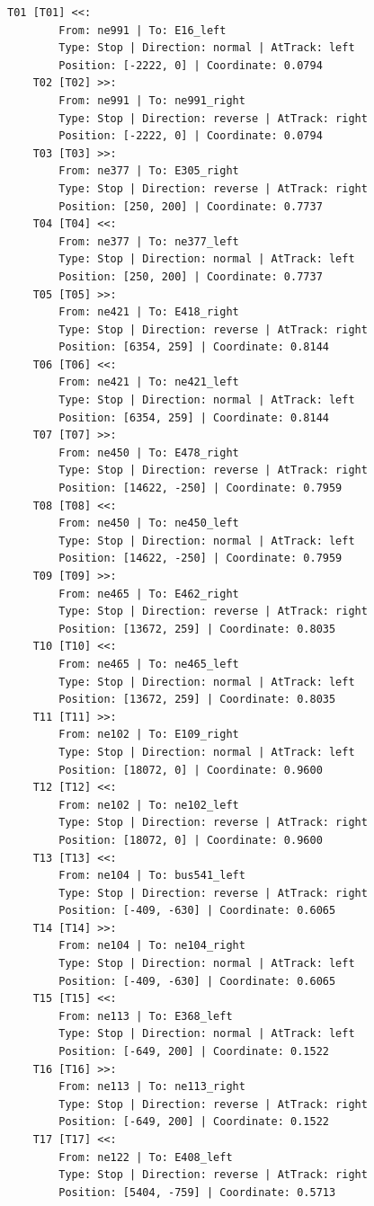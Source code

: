 \begin{lstlisting}[language = {}, tabsize=4, basicstyle=\footnotesize\ttfamily, showspaces=false, showstringspaces=false, caption = Signalling.RNA, label = {lst:EJ4_6}]
	T01 [T01] <<:
		From: ne991 | To: E16_left
		Type: Stop | Direction: normal | AtTrack: left 
		Position: [-2222, 0] | Coordinate: 0.0794
	T02 [T02] >>:
		From: ne991 | To: ne991_right
		Type: Stop | Direction: reverse | AtTrack: right 
		Position: [-2222, 0] | Coordinate: 0.0794
	T03 [T03] >>:
		From: ne377 | To: E305_right
		Type: Stop | Direction: reverse | AtTrack: right 
		Position: [250, 200] | Coordinate: 0.7737
	T04 [T04] <<:
		From: ne377 | To: ne377_left
		Type: Stop | Direction: normal | AtTrack: left 
		Position: [250, 200] | Coordinate: 0.7737
	T05 [T05] >>:
		From: ne421 | To: E418_right
		Type: Stop | Direction: reverse | AtTrack: right 
		Position: [6354, 259] | Coordinate: 0.8144
	T06 [T06] <<:
		From: ne421 | To: ne421_left
		Type: Stop | Direction: normal | AtTrack: left 
		Position: [6354, 259] | Coordinate: 0.8144
	T07 [T07] >>:
		From: ne450 | To: E478_right
		Type: Stop | Direction: reverse | AtTrack: right 
		Position: [14622, -250] | Coordinate: 0.7959
	T08 [T08] <<:
		From: ne450 | To: ne450_left
		Type: Stop | Direction: normal | AtTrack: left 
		Position: [14622, -250] | Coordinate: 0.7959
	T09 [T09] >>:
		From: ne465 | To: E462_right
		Type: Stop | Direction: reverse | AtTrack: right 
		Position: [13672, 259] | Coordinate: 0.8035
	T10 [T10] <<:
		From: ne465 | To: ne465_left
		Type: Stop | Direction: normal | AtTrack: left 
		Position: [13672, 259] | Coordinate: 0.8035
	T11 [T11] >>:
		From: ne102 | To: E109_right
		Type: Stop | Direction: normal | AtTrack: left 
		Position: [18072, 0] | Coordinate: 0.9600
	T12 [T12] <<:
		From: ne102 | To: ne102_left
		Type: Stop | Direction: reverse | AtTrack: right 
		Position: [18072, 0] | Coordinate: 0.9600
	T13 [T13] <<:
		From: ne104 | To: bus541_left
		Type: Stop | Direction: reverse | AtTrack: right 
		Position: [-409, -630] | Coordinate: 0.6065
	T14 [T14] >>:
		From: ne104 | To: ne104_right
		Type: Stop | Direction: normal | AtTrack: left 
		Position: [-409, -630] | Coordinate: 0.6065
	T15 [T15] <<:
		From: ne113 | To: E368_left
		Type: Stop | Direction: normal | AtTrack: left 
		Position: [-649, 200] | Coordinate: 0.1522
	T16 [T16] >>:
		From: ne113 | To: ne113_right
		Type: Stop | Direction: reverse | AtTrack: right 
		Position: [-649, 200] | Coordinate: 0.1522
	T17 [T17] <<:
		From: ne122 | To: E408_left
		Type: Stop | Direction: reverse | AtTrack: right 
		Position: [5404, -759] | Coordinate: 0.5713

\end{lstlisting}
